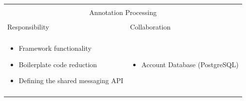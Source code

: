 \begin{tabular}{|l|l|}
    \cline{1-2}
    \multicolumn{2}{|c|}{} \\[-0.3cm]
    \multicolumn{2}{|c|}{Annotation Processing} \\ 
    \multicolumn{2}{|c|}{} \\[-0.3cm]
    \cline{1-2}
    Responsibility & Collaboration \\
    \cline{1-2}
    & \\[-0.2cm]
    \begin{minipage}{6.5cm}
        \begin{itemize}
          \item Framework functionality\footnotemark 
          \item Boilerplate code reduction
          \item Defining the shared messaging API
        \end{itemize} 
    \end{minipage}
	&
    \begin{minipage}{6.5cm}
        \begin{itemize}
          \item Account Database (PostgreSQL)
        \end{itemize} 
    \end{minipage}
	\\ & \\
    \hline
\end{tabular}

